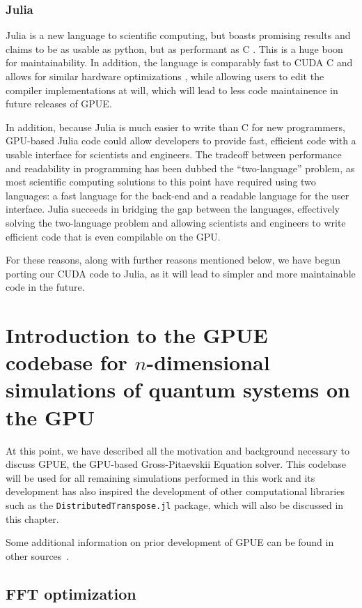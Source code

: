 \subsubsection{Julia}
Julia is a new language to scientific computing, but boasts promising results and claims to be as usable as python, but as performant as C .
This is a huge boon for maintainability.
In addition, the language is comparably fast to CUDA C and allows for similar hardware optimizations \cite{besard2016, besard2018}, while allowing users to edit the compiler implementations at will, which will lead to less code maintainence in future releases of GPUE.

In addition, because Julia is much easier to write than C for new programmers, GPU-based Julia code could allow developers to provide fast, efficient code with a usable interface for scientists and engineers.
The tradeoff between performance and readability in programming has been dubbed the ``two-language'' problem, as most scientific computing solutions to this point have required using two languages: a fast language for the back-end and a readable language for the user interface.
Julia succeeds in bridging the gap between the languages, effectively solving the two-language problem and allowing scientists and engineers to write efficient code that is even compilable on the GPU.

For these reasons, along with further reasons mentioned below, we have begun porting our CUDA code to Julia, as it will lead to simpler and more maintainable code in the future.

\section{Introduction to the GPUE codebase for $n$-dimensional simulations of quantum systems on the GPU}

At this point, we have described all the motivation and background necessary to discuss GPUE, the GPU-based Gross-Pitaevskii Equation solver.
This codebase will be used for all remaining simulations performed in this work and its development has also inspired the development of other computational libraries such as the \texttt{DistributedTranspose.jl} package, which will also be discussed in this chapter.

Some additional information on prior development of GPUE can be found in other sources~\cite{o2017}.

\subsection{FFT optimization}

